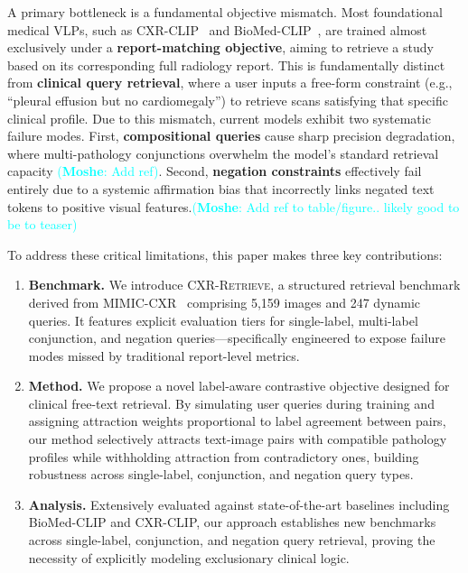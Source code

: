\documentclass[10pt,twocolumn,letterpaper]{article}
\newcommand\mk[1]{\textcolor{cyan}{(\textbf{Moshe}: #1)}}
\begin{document}
A primary bottleneck is a fundamental objective mismatch. Most foundational medical VLPs, such as CXR-CLIP~\cite{you2023cxrclip} and BioMed-CLIP~\cite{biomedclip}, are trained almost exclusively under a \textbf{report-matching objective}, aiming to retrieve a study based on its corresponding full radiology report. This is fundamentally distinct from \textbf{clinical query retrieval}, where a user inputs a free-form constraint (e.g., ``pleural effusion but no cardiomegaly'') to retrieve scans satisfying that specific clinical profile. Due to this mismatch, current models exhibit two systematic failure modes. First, \textbf{compositional queries} cause sharp precision degradation, where multi-pathology conjunctions overwhelm the model's standard retrieval capacity \mk{Add ref}. Second, \textbf{negation constraints} effectively fail entirely due to a systemic affirmation bias that incorrectly links negated text tokens to positive visual features.\mk{Add ref to table/figure.. likely good to be to teaser}

To address these critical limitations, this paper makes three key contributions:
\begin{enumerate}
    \item \textbf{Benchmark.} We introduce \textsc{CXR-Retrieve}, a structured retrieval benchmark derived from MIMIC-CXR~\cite{johnson2019mimic} comprising 5,159 images and 247 dynamic queries. It features explicit evaluation tiers for single-label, multi-label conjunction, and negation queries---specifically engineered to expose failure modes missed by traditional report-level metrics.
    
    \item \textbf{Method.} We propose a novel label-aware contrastive objective designed for clinical free-text retrieval. By simulating user queries during training and assigning attraction weights
  proportional to label agreement between pairs, our method selectively attracts text-image pairs with compatible pathology profiles while withholding attraction from contradictory ones, building robustness across single-label, conjunction, and negation query types.
    
    \item \textbf{Analysis.} Extensively evaluated against state-of-the-art baselines including BioMed-CLIP and CXR-CLIP, our approach establishes new benchmarks across single-label, conjunction, and negation query retrieval, proving the necessity of explicitly modeling exclusionary clinical logic.
\end{enumerate}
\end{document}
